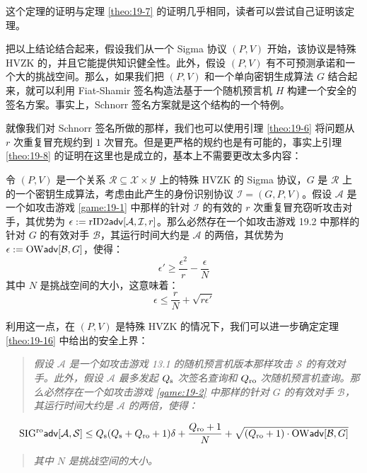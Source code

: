 这个定理的证明与定理 \ref{theo:19-7} 的证明几乎相同，读者可以尝试自己证明该定理。

把以上结论结合起来，假设我们从一个 Sigma 协议 $(P, V)$ 开始，该协议是特殊 HVZK 的，并且它能提供知识健全性。此外，假设 $(P, V)$ 有不可预测承诺和一个大的挑战空间。那么，如果我们把 $(P, V)$ 和一个单向密钥生成算法 $G$ 结合起来，就可以利用 Fiat-Shamir 签名构造法基于一个随机预言机 $H$ 构建一个安全的签名方案。事实上，Schnorr 签名方案就是这个结构的一个特例。

就像我们对 Schnorr 签名所做的那样，我们也可以使用引理 \ref{theo:19-6} 将问题从 $r$ 次重复冒充规约到 $1$ 次冒充。但是更严格的规约也是有可能的，事实上引理 \ref{theo:19-8} 的证明在这里也是成立的，基本上不需要更改太多内容：

\begin{lemma}\label{theo:19-17}
令 $(P,V)$ 是一个关系 $\mathcal{R}\subseteq\mathcal{X}×\mathcal{Y}$ 上的特殊 HVZK 的 Sigma 协议，$G$ 是 $\mathcal{R}$ 上的一个密钥生成算法，考虑由此产生的身份识别协议 $\mathcal{I}=(G,P,V)$。假设 $\mathcal{A}$ 是一个如攻击游戏 \ref{game:19-1} 中那样的针对 $\mathcal{I}$ 的有效的 $r$ 次重复冒充窃听攻击对手，其优势为 $\epsilon:={\rm rID2\mathsf{adv}}[\mathcal{A},\mathcal{I},r]$。那么必然存在一个如攻击游戏 19.2 中那样的针对 $G$ 的有效对手 $\mathcal{B}$，其运行时间大约是 $\mathcal{A}$ 的两倍，其优势为 $\epsilon:={\rm OW\mathsf{adv}}[\mathcal{B},G]$，使得：
\begin{equation}
\epsilon'\geq\frac{\epsilon^2}{r}-\frac{\epsilon}{N}
\end{equation}
其中 $N$ 是挑战空间的大小，这意味着：
\begin{equation}\label{eq:19-20}
\epsilon\leq\frac{r}{N}+\sqrt{r\epsilon'}
\end{equation}
\end{lemma}

利用这一点，在 $(P, V )$ 是特殊 HVZK 的情况下，我们可以进一步确定定理 \ref{theo:19-16} 中给出的安全上界：

\begin{quote}
\emph{假设 $\mathcal{A}$ 是一个如攻击游戏 13.1 的随机预言机版本那样攻击 $\mathcal{S}$ 的有效对手。此外，假设 $\mathcal{A}$ 最多发起 $Q_{\rm s}$ 次签名查询和 $Q_{\rm ro}$ 次随机预言机查询。那么必然存在一个如攻击游戏 \ref{game:19-2} 中那样的针对 $G$ 的有效对手 $\mathcal{B}$，其运行时间大约是 $\mathcal{A}$ 的两倍，使得：}
\end{quote}
\begin{equation}
{\rm SIG^{ro}\mathsf{adv}}[\mathcal{A},\mathcal{S}]\leq Q_{\rm s}(Q_{\rm s}+Q_{\rm ro}+1)\delta+\frac{Q_{\rm ro}+1}{N}+\sqrt{(Q_{\rm ro}+1)\cdot{\rm OW\mathsf{adv}}[\mathcal{B},G]}
\end{equation}
\begin{quote}
\emph{其中 $N$ 是挑战空间的大小。}
\end{quote}

